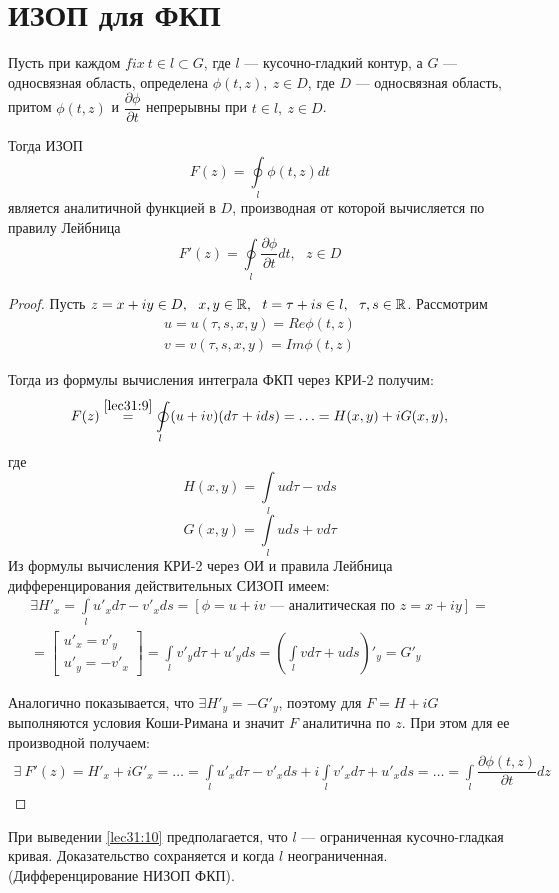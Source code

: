 \documentclass[../../main.tex]{subfiles}
\begin{document}
\section{ИЗОП для ФКП}
\begin{thm}
    Пусть при каждом $fix \ t \in l \subset G$, где $l$ --- кусочно-гладкий
    контур, а $G$ --- односвязная область, определена $ \phi(t, z), \
    z \in D $, где $D$ --- односвязная область, притом
    $\phi(t, z)$ и $\dfrac{\partial \phi}{\partial t}$ непрерывны при
    $t \in l, \ z \in D$.
    
    Тогда ИЗОП
    \begin{equation}
        \label{lec31:9}
        F(z) = \oint\limits_{l} \phi(t, z) dt
    \end{equation}
    является аналитичной функцией в $D$, производная от которой вычисляется
    по правилу Лейбница
    \begin{equation}
        \label{lec31:10}
        F'(z) = \oint\limits_{l} \dfrac{\partial \phi}{\partial t} dt,
        \ \ \ z \in D
    \end{equation}
\end{thm}
\begin{proof}
    Пусть $z = x + i y \in D, \ \ x, y \in \R, \ \ t = \tau + i s \in l,
    \ \ \tau, s \in \R$. Рассмотрим \[ \begin{gathered}
    u = u(\tau, s, x, y) = Re \phi(t, z) \\
    v = v(\tau, s, x, y) = Im \phi(t, z)
    \end{gathered} \]

    Тогда из формулы вычисления интеграла ФКП через КРИ-2 получим:
    \[ F(z) \stackrel{\eqref{lec31:9}}{=} \oint\limits_{l} (u + i v)
    (d \tau + i d s) = \ldots = H(x, y) + i G(x, y),\]
    где
    \[ H(x, y) = \int\limits_{l} u d \tau - v d s \]
    \[ G(x, y) = \int\limits_{l} u d s + v d \tau \]
    Из формулы вычисления КРИ-2 через ОИ и правила Лейбница
    дифференцирования действительных СИЗОП имеем:
    \[ \begin{gathered} 
        \exists H'_x = \int\limits_{l} u'_x d \tau - v'_x d s =
        [ \phi = u + i v \text{ \ --- аналитическая по \ } z = x + i y ]
        = \\ =
        \left[\begin{gathered}
            u'_x = v'_y \\
            u'_y = - v'_x
        \end{gathered}\right] =
        \int\limits_{l} v'_y d \tau + u'_y d s =
        \left(\int\limits_{l} v d \tau + u d s\right)'_y = G'_y
    \end{gathered} \]

    Аналогично показывается, что $\exists H'_y = -G'_y$, поэтому для
    $ F = H + i G $
    выполняются условия Коши-Римана и значит $F$ аналитична по $z$.
    При этом для ее производной получаем:
    \[\begin{gathered}
        \exists \ F'(z) = H'_x + i G'_x = \ldots =
        \int\limits_{l} u'_x d \tau - v'_x d s + 
        i \int\limits_{l} v'_x d \tau + u'_x d s = \ldots =
        \int\limits_{l} \dfrac{\partial \phi (t, z)}{\partial t} d z
    \end{gathered}\] 
\end{proof}
\begin{rem}
    При выведении \eqref{lec31:10} предполагается, что $l$ ---
    ограниченная кусочно-гладкая кривая. Доказательство сохраняется
    и когда $l$ неограниченная. (Дифференцирование НИЗОП ФКП).
\end{rem}
\end{document}
